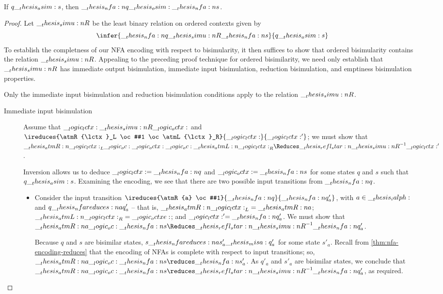\begin{theorem}
  If $q \__thesis_asim: s$, then $\__thesis_nfa:n {q} \__thesis_osim: \__thesis_nfa:n {s}$.
\end{theorem}
%
\begin{proof}
  Let $\__thesis_simu:n {R}$ be the least binary relation%
  on ordered contexts given by
  \begin{equation*}
    \infer{\nfa{q} \simu{R} \nfa{s}}{
      q \asim s}
  \end{equation*}
  To establish the completness of our \ac{NFA} encoding with respect to bisimularity, it then suffices to show that ordered bisimularity contains the relation $\__thesis_simu:n {R}$.
  Appealing to the preceding proof technique for ordered bisimilarity, we need only establish that $\__thesis_simu:n {R}$ has immediate output bisimulation, immediate input bisimulation, reduction bisimulation, and emptiness bisimulation properties.

  Only the immediate input bisimulation and reduction bisimulation conditions apply to the relation $\__thesis_simu:n {R}$.
  \begin{description}
  \item[Immediate input bisimulation]
    Assume that $\__logic_lctx: \__thesis_simu:n {R} \__logic_octx:$ and $\ireduces{\atmR{\lctx}_L \oc #1 \oc \atmL{\lctx}_R}{\lctx}{\lctx'}$;
    we must show that $\atmR{\lctx}_L \oc \octx \oc \atmL{\lctx}_R \Reduces\refl*{\simu{R}}^{-1} \lctx'$.

    Inversion allows us to deduce $\__logic_lctx: = \__thesis_nfa:n {q}$ and $\__logic_octx: = \__thesis_nfa:n {s}$ for some states $q$ and $s$ such that $q \__thesis_asim: s$.
    Examining the encoding, we see that there are two possible input transitions from $\__thesis_nfa:n {q}$.
    \begin{itemize}
    \item Consider the input transition $\ireduces{\atmR{a} \oc #1}{\nfa{q}}{\nfa{q}'_a}$, with $a \in \__thesis_ialph:$ and $q \nfareduces[a] q'_a$ -- that is, $\__thesis_atmR:n {\__logic_lctx:}_L = \__thesis_atmR:n {a}$; $\__thesis_atmL:n {\__logic_lctx:}_R = \__logic_octxe:$; and $\__logic_lctx:' = \__thesis_nfa:n {q}'_a$.
      We must show that $\atmR{a} \oc \nfa{s} \Reduces\refl*{\simu{R}}^{-1} \nfa{q}'_a$.

      Because $q$ and $s$ are bisimilar states, $s \nfareduces[a] s'_a \misa q'_a$ for some state $s'_a$.
      Recall from \cref{thm:nfa-encoding-reduces} that the encoding of \acp{NFA} is complete with respect to input transitions; so, $\atmR{a} \oc \nfa{s} \reduces \nfa{s}'_a$.
      As $q'_a$ and $s'_a$ are bisimilar states, we conclude that $\atmR{a} \oc \nfa{s} \reduces\refl*{\simu{R}}^{-1} \nfa{q}'_a$, as required.


\end{itemize}
\end{description}
\end{proof}

